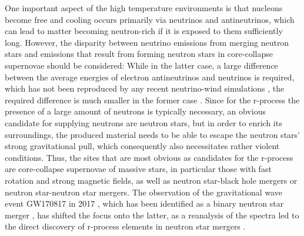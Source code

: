 \documentclass[a4paper,11pt]{article}
\begin{document}
%
One important aspect of the high temperature environments is that nucleons become free and cooling occurs primarily via neutrinos and antineutrinos, which can lead to matter becoming neutron-rich if it is exposed to them sufficiently long. However, the disparity between neutrino emissions from merging neutron stars and emissions that result from forming neutron stars in core-collapse supernovae should be considered: While in the latter case, a large difference between the average energies of electron antineutrinos and neutrinos is required, which has not been reproduced by any recent neutrino-wind simulations \citep{martinez14,fischer20}, the required difference is much smaller in the former case \citep{foucart16}. Since for the r-process the presence of a large amount of neutrons is typically necessary, an obvious candidate for supplying neutrons are neutron stars, but in order to enrich its surroundings, the produced material needs to be able to escape the neutron stars' strong gravitational pull, which consequently also necessitates rather violent conditions. Thus, the sites that are most obvious as candidates for the r-process are core-collapse supernovae of massive stars, in particular those with fast rotation and strong magnetic fields, as well as neutron star-black hole mergers or neutron star-neutron star mergers. The observation of the gravitational wave event GW170817 in 2017 \citep{gw170817a}, which has been identified as a binary neutron star merger \citep{gw170817b,gw170817c}, has shifted the focus onto the latter, as a reanalysis of the spectra led to the direct discovery of r-process elements in neutron star mergers \citep{watson19}.\\ \\
%
\end{document}
